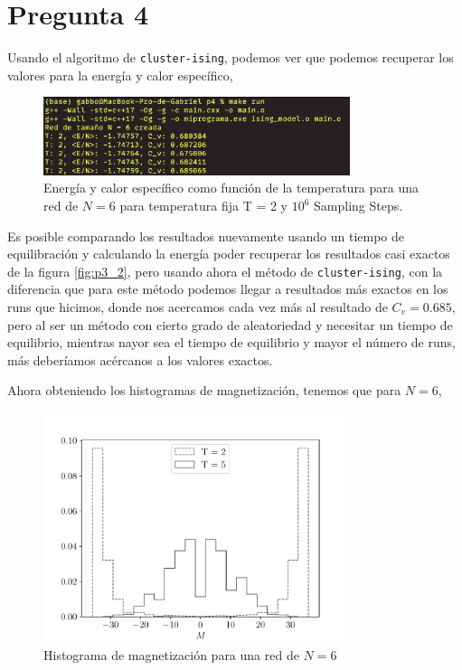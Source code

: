 \documentclass[11pt,a4paper]{article}
\begin{document}
\section*{Pregunta 4}
Usando el algoritmo de \texttt{cluster-ising}, podemos ver que podemos recuperar los valores para la energía y calor específico, 
\begin{figure}[H]
    \centering
    \includegraphics[width=0.8\textwidth]{p4/p4_1.png}
    \caption{Energía y calor específico como función de la temperatura para una red de $N = 6$ para temperatura fija T = 2 y $10^6$ Sampling Steps.}
    \label{fig:p4}
\end{figure}
Es posible comparando los resultados nuevamente usando un tiempo de equilibración y calculando la energía poder recuperar los resultados casi exactos de la figura \ref{fig:p3_2}, pero usando ahora el método de \texttt{cluster-ising}, con 
la diferencia que para este método podemos llegar a resultados más exactos en los runs que hicimos, donde nos acercamos cada vez más al resultado de $C_v = 0.685$, pero al ser un método con cierto grado de aleatoriedad y necesitar un tiempo de equilibrio, mientras 
nayor sea el tiempo de equilibrio y mayor el número de runs, más deberíamos acércanos a los valores exactos.

Ahora obteniendo los histogramas de magnetización, tenemos que para $N=6$,
\begin{figure}[H]
    \centering
    \includegraphics[width=0.8\textwidth]{p4/N6_magnetization_hist.pdf}
    \caption{Histograma de magnetización para una red de $N = 6$}
    \label{fig:p4_1}
\end{figure}
\end{document}
